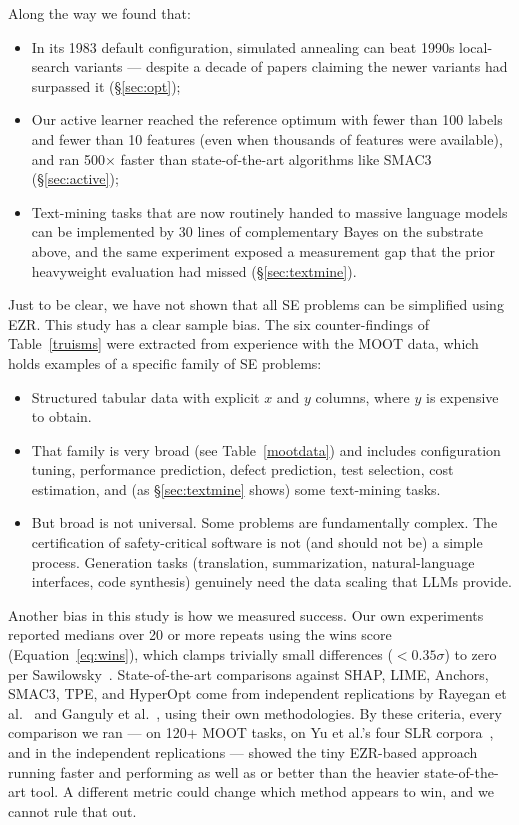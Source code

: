 \documentclass[AMA,STIX2COL]{WileyNJDv5}
\newcommand{\IT}{{\sffamily EZR}}
\begin{document}
{{Along the way we found that:
\begin{itemize}
\item In its 1983 default configuration, simulated annealing
can beat 1990s local-search variants --- despite a decade of
papers claiming the newer variants had surpassed it
(\S\ref{sec:opt});
\item Our active learner reached the reference optimum with
fewer than 100 labels and fewer than 10 features (even when
thousands of features were available), and ran 500$\times$
faster than state-of-the-art algorithms like SMAC3
(\S\ref{sec:active});
\item Text-mining tasks that are now routinely handed to
massive language models can be implemented by 30 lines of
complementary Bayes on the substrate above, and the same
experiment exposed a measurement gap that the prior
heavyweight evaluation had missed (\S\ref{sec:textmine}).
\end{itemize}
Just to be clear, we have not shown 
that  all SE problems can be simplified using \IT{}.
This study has a clear sample bias. The six counter-findings
of Table~\ref{truisms} were extracted from experience with
the MOOT data, which holds examples of a specific family of
SE problems:
\begin{itemize}
\item Structured tabular data with explicit $x$ and $y$
columns, where $y$ is expensive to obtain.
\item That family is very broad (see Table~\ref{mootdata})
and includes configuration tuning, performance prediction,
defect prediction, test selection, cost estimation, and (as
\S\ref{sec:textmine} shows) some text-mining tasks.
\item But broad is not universal. Some problems are
fundamentally complex. The certification of safety-critical
software is not (and should not be) a simple process.
Generation tasks (translation, summarization,
natural-language interfaces, code synthesis) genuinely need
the data scaling that LLMs provide.
\end{itemize}
 Another bias in this study is how we measured success. Our
own experiments reported medians over 20 or more repeats
using the \textsf{wins} score (Equation~\ref{eq:wins}), which
clamps trivially small differences ($<0.35\sigma$) to zero
per Sawilowsky~\cite{sawilowsky2009new}. State-of-the-art
comparisons against SHAP, LIME, Anchors, SMAC3, TPE, and
HyperOpt come from independent replications by Rayegan et
al.~\cite{Amiraliminimaldata} and Ganguly et
al.~\cite{ganguly2026lowgodatalightse}, using their own
methodologies. By these criteria, every comparison we ran
--- on 120+ MOOT tasks, on Yu et al.'s four SLR
corpora~\cite{yu2018total}, and in the independent
replications --- showed the tiny EZR-based approach running
faster and performing as well as or better than the heavier
state-of-the-art tool. A different metric could change which
method appears to win, and we cannot rule that out.

}}
\end{document}
